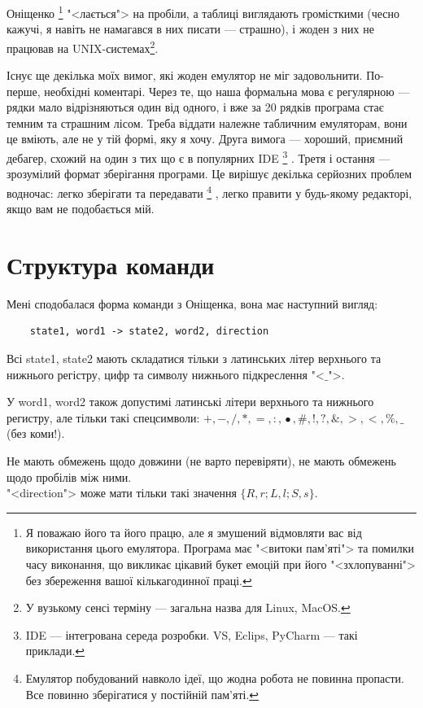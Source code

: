 \documentclass[oneside,final,14pt]{extreport}
\begin{document}
Оніщенко
\footnote{Я поважаю його та його працю, але я змушений відмовляти вас від використання цього емулятора. Програма має "<витоки пам'яті"> та помилки часу виконання, що викликає цікавий букет емоцій при його "<зхлопуванні"> без збереження вашої кількагодинної праці.}
 "<лається"> на пробіли, а таблиці виглядають громісткими (чесно кажучі, я навіть не намагався в них писати --- страшно), і жоден з них не працював на UNIX-системах\footnote{У вузькому сенсі терміну --- загальна назва для Linux, MacOS.}.

Існує ще декілька моїх вимог, які жоден емулятор не міг задовольнити. По-перше, необхідні коментарі. Через те, що наша формальна мова є регулярною  --- рядки мало відрізняються один від одного, і вже за 20 рядків програма стає темним та страшним лісом. Треба віддати належне табличним емуляторам, вони це вміють, але не у тій формі, яку я хочу.
Друга вимога --- хороший, приємний дебагер, схожий на один з тих що є в популярних IDE
\footnote{IDE --- інтегрована середа розробки. VS, Eclips, PyCharm --- такі приклади.}
. Третя і остання --- зрозумілий формат зберігання програми. Це вирішує декілька серйозних проблем водночас: легко зберігати та передавати
\footnote{Емулятор побудований навколо ідеї, що жодна робота не повинна пропасти. Все повинно зберігатися у постійній пам'яті.}
, легко правити у будь-якому редакторі, якщо вам не подобається мій.

\section{Структура команди}

Мені сподобалася форма команди з Оніщенка, вона має наступний вигляд:

\begin{verbatim}
	state1, word1 -> state2, word2, direction
\end{verbatim}

Всі state1, state2 мають складатися тільки з латинських літер верхнього та нижнього регістру, цифр та символу нижнього підкреслення "<$\_$">.
		
У word1, word2 також допустимі латинські літери верхнього та нижнього регистру, але тільки такі спецсимволи: $+,-,/,*,=,:,\hat{•},\#,!,?,\&,>,<,\%,\_$\\ (без коми!). 
		
Не мають обмежень щодо довжини (не варто перевіряти), не мають обмежень щодо пробілів між ними.
\\
"<direction">  може мати тільки такі значення $\{R,r;L,l;S,s\}$.
\end{document}
